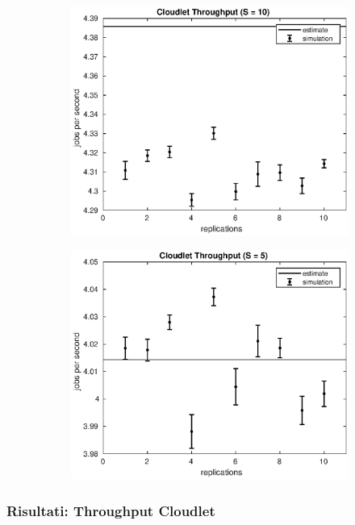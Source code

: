 \begin{frame}
\begin{figure}[!h]
\begin{subfigure}[t]{0.49\textwidth}
\label{15_xclet}
\end{subfigure}
%
\begin{subfigure}[t]{0.49\textwidth}
\includegraphics[width=\textwidth]{../figures/simul/10_500K_xclet}
\label{10_xclet}
\end{subfigure}
%
\begin{subfigure}[t]{0.49\textwidth}
\includegraphics[width=\textwidth]{../figures/simul/5_500K_xclet}
\label{5_xclet}
\end{subfigure}
%
\label{plot:xclet}
\end{figure}
%
%
\end{frame}
\begin{frame}
\frametitle{Risultati: Throughput Cloudlet}

\end{frame}
